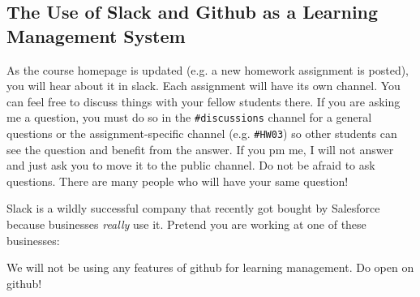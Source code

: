 \subsection*{The Use of Slack and Github as a Learning Management System}

As the course homepage is updated (e.g. a new homework assignment is posted), you will hear about it in slack. Each assignment will have its own channel. You can feel free to discuss things with your fellow students there. If you are asking me a question, you must do so in the \texttt{\#discussions} channel for a general questions or the assignment-specific channel (e.g. \texttt{\#HW03}) so other students can see the question and benefit from the answer. If you pm me, I will not answer and just ask you to move it to the public channel. Do not be afraid to ask questions. There are many people who will have your same question! 

Slack is a wildly successful company that recently got bought by Salesforce because businesses \emph{really} use it. Pretend you are working at one of these businesses:  

We will not be using any features of github for learning management. Do  open  on github! 
